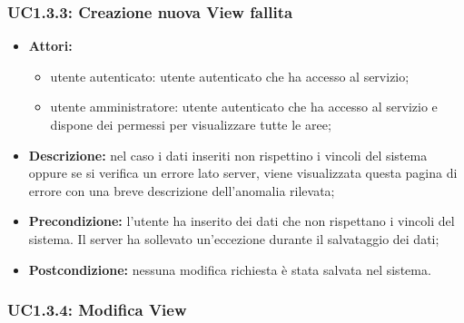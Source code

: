 \subsubsection{UC1.3.3: Creazione nuova View fallita}

\begin{itemize}
   	\item \textbf{Attori:}
    \begin{itemize}
    	\item utente autenticato: utente autenticato che ha accesso al servizio;
    	\item utente amministratore: utente autenticato che ha accesso al servizio e dispone dei permessi per visualizzare tutte le aree;
	\end{itemize}
    \item \textbf{Descrizione:} nel caso i dati inseriti non rispettino i vincoli del sistema oppure se si verifica un errore lato server, viene visualizzata questa pagina di errore con una breve descrizione dell'anomalia rilevata;
    \item \textbf{Precondizione:} l'utente ha inserito dei dati che non rispettano i vincoli del sistema. Il server ha sollevato un'eccezione durante il salvataggio dei dati;
    \item \textbf{Postcondizione:} nessuna modifica richiesta è stata salvata nel sistema.
\end{itemize}

\subsubsection{UC1.3.4: Modifica View}

